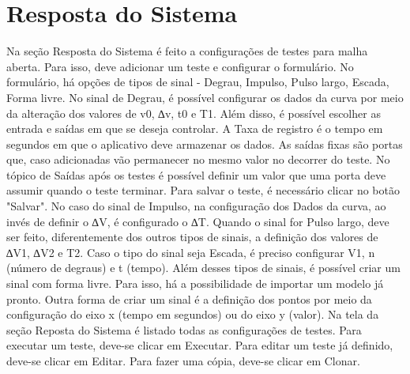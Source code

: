 
\chapter{Resposta do Sistema}%
\label{chapter:branching-and-iteration}

Na seção Resposta do Sistema é feito a configurações de testes para malha aberta.  Para isso, deve adicionar um teste e configurar o formulário. No formulário, há opções de tipos de sinal - Degrau, Impulso, Pulso largo, Escada, Forma livre. 
No sinal de Degrau, é possível configurar os dados da curva por meio da alteração dos valores de v0, ∆v, t0 e T1. Além disso, é possível escolher as entrada e saídas em que se deseja controlar. A Taxa de registro é o tempo em segundos em que o aplicativo deve armazenar os dados. As saídas fixas são portas que, caso adicionadas vão permanecer no mesmo valor no decorrer do teste. No tópico de Saídas após os testes é possível definir um valor que uma porta deve assumir quando o teste terminar. Para salvar o teste, é necessário clicar no botão "Salvar".
No caso do sinal de Impulso, na configuração dos Dados da curva, ao invés de definir o ∆V, é configurado o ∆T.
Quando o sinal for Pulso largo, deve ser feito, diferentemente dos outros tipos de sinais, a definição dos valores de ∆V1, ∆V2 e T2.
Caso o tipo do sinal seja Escada, é preciso configurar V1, n (número de degraus) e t (tempo).
Além desses tipos de sinais, é possível criar um sinal com forma livre. Para isso, há a possibilidade de importar um modelo já pronto. Outra forma de criar um sinal é a definição dos pontos por meio da configuração do eixo x (tempo em segundos) ou do eixo y (valor).
Na tela da seção Reposta do Sistema é listado todas as configurações de testes. Para executar um teste, deve-se clicar em Executar. Para editar um teste já definido, deve-se clicar em Editar. Para fazer uma cópia, deve-se clicar em Clonar. 

